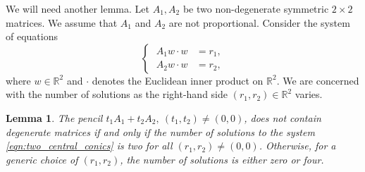 \documentclass[12pt]{article}
\newtheorem{lemma}{Lemma}[section]
\newcommand{\R}{{\mathbb R}}
\begin{document}
We will need another lemma. Let $A_1, A_2$ be two non-degenerate symmetric $2\times 2$ matrices. We assume that $A_1$ and $A_2$ are not proportional. Consider the system of equations
\begin{equation}\label{eqn:two_central_conics}
\left\{\;
\begin{aligned}
A_1 w \cdot w&=r_1,\\
A_2 w \cdot w&=r_2,
\end{aligned}\right.
\end{equation}
where $w\in \R^2$ and $\cdot$ denotes the Euclidean inner product on $\R^2$. We are concerned with the number of solutions as the right-hand side $(r_1,r_2)\in \R^2$ varies.

\begin{lemma} \label{lm:central_conics}
The pencil $t_1 A_1 + t_2 A_2,\ (t_1,t_2)\neq (0,0)$, does not contain degenerate matrices if and only if the number of solutions to the system \eqref{eqn:two_central_conics} is two for all $(r_1,r_2)\neq (0,0)$. Otherwise, for a generic choice of $(r_1,r_2)$, the number of solutions is either zero or four.
\end{lemma}
\end{document}
